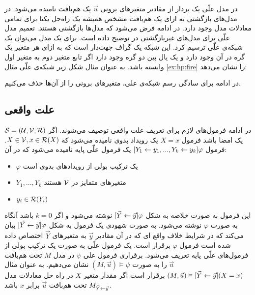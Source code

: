 در مدل علّی یک بردار از مقادیر متغیر‌های برونی
$\vec u$
یک هم‌بافت
نامیده می‌شود.
در مدل‌های بازگشتی به ازای یک هم‌بافت مشخص همیشه یک راه‌حل یکتا برای تمامی معادلات مدل وجود دارد.
در ادامه فرض می‌شود که مدل‌ها بازگشتی هستند. تعمیم مدل‌ علّی برای مدل‌های غیربازگشتی در
\cite{hp}
توضیح داده است.
برای یک مدل می‌توان یک شبکه‌ی علّی ترسیم کرد.
این شبکه یک گراف جهت‌دار است که به ازای هر متغیر یک گره در آن وجود دارد و یک یال بین دو گره وجود دارد اگر تابع متغیر دوم به متغیر اول وابسته باشد.
به عنوان مثال شکل زیر شبکه‌ی علّی مثال
\ref{ex:hp:fire}
را نشان می‌دهد:
\begin{center}
\end{center}
در ادامه برای سادگی رسم شبکه‌ی علی، متغیر‌های برونی را از آن‌ها حذف می‌کنیم.
\subsection{علت واقعی}
در ادامه‌ فرمول‌های لازم برای تعریف علت واقعی توصیف می‌شوند.
اگر
$\mathcal{S} = (\mathcal{U},\mathcal{V},\mathcal{R})$
یک امضا باشد فرمول
‍‍$X=x$
یک رویداد بدوی
نامیده می‌شود که
‍$X \in \mathcal{V},x \in \mathcal{R}(X)$.
فرمول
$[Y_1 \leftarrow y_1,...,Y_k\leftarrow y_k]\varphi$
یک فرمول علّی پایه
نامیده می‌شود که در آن:
\begin{itemize}
      \item $\varphi$
            یک ترکیب بولی از رویداد‌های بدوی است
      \item $Y_1,...,Y_k$
            متغیر‌های متمایز در
            $\mathcal{V}$
            هستند
      \item $y_i \in \mathcal{R}(Y_i)$
\end{itemize}
این فرمول به صورت خلاصه به شکل
$[\vec{Y}\leftarrow \vec{y}]\varphi$
نوشته می‌شود و اگر
$k=0$
باشد آنگاه به صورت
$\varphi$
نوشته می‌شود.
به صورت شهودی یک فرمول به شکل
$[\vec{Y}\leftarrow \vec{y}]\varphi$
بیان می‌کند که در شرایط خلاف واقع‌ ای که در آن مقادیر
$\vec{y}$
به متغیر‌های
$\vec{Y}$
اختصاص داده شده است فرمول
$\varphi$
برقرار است.
یک فرمول علّی به صورت یک ترکیب بولی از فرمول‌های علّی پایه تعریف می‌شود.
برقراری فرمول علی
$\psi$
در مدل
$M$
تحت هم‌بافت
$\vec u$
را به صورت
$(M,\vec u) \vDash \psi$
نشان می‌دهیم.
به عنوان مثال
$(M,\vec{u}) \vDash [\vec{Y}\leftarrow \vec{y}](X=x)$
برقرار است اگر مقدار متغیر
$X$
در راه حل معادلات مدل
$M_{\vec{Y}\leftarrow \vec{y}}$
تحت هم‌بافت
$\vec u$
برابر
$x$
باشد.

